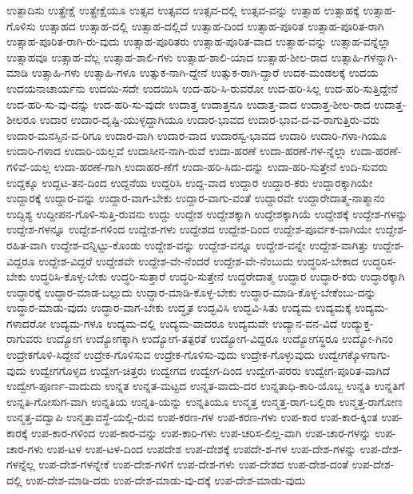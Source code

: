 {ಉತ್ಪಾದಿಸು
ಉತ್ಪ್ರೇಕ್ಷೆ
ಉತ್ಪ್ರೇಕ್ಷೆಯೂ
ಉತ್ಸವ
ಉತ್ಸವದ
ಉತ್ಸವ-ದಲ್ಲಿ
ಉತ್ಸವ-ವನ್ನು
ಉತ್ಸಾಹ
ಉತ್ಸಾಹಕ್ಕೆ
ಉತ್ಸಾಹ-ಗೊಳಿಸು
ಉತ್ಸಾಹದ
ಉತ್ಸಾಹ-ದಲ್ಲಿ
ಉತ್ಸಾಹ-ದಲ್ಲಿದೆ
ಉತ್ಸಾಹ-ದಿಂದ
ಉತ್ಸಾಹ-ಪೂರಿತ
ಉತ್ಸಾಹ-ಪೂರಿತ-ರಾಗಿ
ಉತ್ಸಾಹ-ಪೂರಿತ-ರಾಗಿ-ರು-ವುದು
ಉತ್ಸಾಹ-ಪೂರಿತರು
ಉತ್ಸಾಹ-ಪೂರಿತ-ವಾದ
ಉತ್ಸಾಹ-ವನ್ನು
ಉತ್ಸಾಹ-ವನ್ನೆಲ್ಲಾ
ಉತ್ಸಾಹವೂ
ಉತ್ಸಾಹ-ವೆಲ್ಲ
ಉತ್ಸಾಹ-ಶಾಲಿ-ಗಳು
ಉತ್ಸಾಹ-ಶಾಲಿ-ಯಾದ
ಉತ್ಸಾಹ-ಶೀಲ-ರಾದ
ಉತ್ಸಾಹಿ-ಗಳನ್ನಾಗಿ-ಮಾಡಿ
ಉತ್ಸಾಹಿ-ಗಳು
ಉತ್ಸಾಹಿ-ಗಳೂ
ಉತ್ಸುಕ-ನಾಗಿ-ದ್ದೇನೆ
ಉತ್ಸುಕ-ರಾಗಿ-ದ್ದಾರೆ
ಉದಕ-ಮಂಡಲಕ್ಕೆ
ಉದಯ
ಉದಯನಾಚಾರ್ಯನು
ಉದಯಿ-ಸದೇ
ಉದಯಿಸಿ
ಉದ-ಹರಿ-ಸಿ-ರುವರೋ
ಉದ-ಹರಿ-ಸಿಲ್ಲ
ಉದ-ಹರಿ-ಸುತ್ತಿದ್ದೇನೆ
ಉದ-ಹರಿ-ಸು-ವು-ದನ್ನು
ಉದ-ಹರಿ-ಸು-ವುದೇ
ಉದಾತ್ತ
ಉದಾತ್ತನೂ
ಉದಾತ್ತ-ವಾದ
ಉದಾತ್ತ-ಶೀಲ-ರಾದ
ಉದಾತ್ತ-ಶೀಲರೂ
ಉದಾರ
ಉದಾರ-ದೃಷ್ಟಿ-ಯುಳ್ಳದ್ದಾಗಿಯೂ
ಉದಾರ-ಭಾವದ
ಉದಾರ-ಭಾವ-ದ-ವ-ರಾಗುತ್ತಿರು-ವರು
ಉದಾರ-ಮನಸ್ಸಿನ-ವ-ರಿಗೂ
ಉದಾರ-ವಾಗಿ
ಉದಾರ-ವಾದ
ಉದಾರಸ್ವ-ಭಾವದ
ಉದಾರಿ
ಉದಾರಿ-ಗಳಾ-ಗಿಯೂ
ಉದಾರಿ-ಗಳಾದ
ಉದಾರಿ-ಯಲ್ಲವೆ
ಉದಾಸೀನ-ನಾಗಿ-ರುವೆ
ಉದಾ-ಹರಣೆ
ಉದಾ-ಹರಣೆ-ಗಳ-ನ್ನೆಲ್ಲಾ
ಉದಾ-ಹರಣೆ-ಗಳಿವೆ-ಯಲ್ಲ
ಉದಾ-ಹರಣೆ-ಗಾಗಿ
ಉದಾಹರ-ಣೆಗೆ
ಉದಾ-ಹರಿ-ಸಿದು-ದನ್ನು
ಉದಾ-ಹರಿ-ಸುತ್ತೇನೆ
ಉದಿ-ಸುವರು
ಉದ್ದಕ್ಕೂ
ಉದ್ದಟ-ತನ-ದಿಂದ
ಉದ್ದನೆಯ
ಉದ್ದರಿಸಿ
ಉದ್ದ-ವಾದ
ಉದ್ದಾರ
ಉದ್ದಾರ-ಕರು
ಉದ್ದಾರಕ್ಕಾಗಿಯೇ
ಉದ್ದಾರಕ್ಕೆ
ಉದ್ದಾರ-ವನ್ನು
ಉದ್ದಾರ-ವಾಗ-ಬೇಕು
ಉದ್ದಾರ-ವಾಗು-ವಂತೆ
ಉದ್ದಾರವೇ
ಉದ್ದಾರೇದಾತ್ಮ-ನಾತ್ಮಾನಂ
ಉದ್ದಿಶ್ಯ
ಉದ್ದೀಪನ-ಗೊಳಿ-ಸುತ್ತಿ-ರುವನು
ಉದ್ದು
ಉದ್ದೇಶ
ಉದ್ದೇಶಕ್ಕಾಗಿ
ಉದ್ದೇಶಕ್ಕಾಗಿಯೆ
ಉದ್ದೇಶಕ್ಕೆ
ಉದ್ದೇಶ-ಗಳನ್ನು
ಉದ್ದೇಶ-ಗಳನ್ನೂ
ಉದ್ದೇಶ-ಗಳಿಂದ
ಉದ್ದೇಶ-ಗಳು
ಉದ್ದೇಶದ
ಉದ್ದೇಶ-ದಿಂದ
ಉದ್ದೇಶ-ಪೂರ್ವಕ-ವಾಗಿಯೇ
ಉದ್ದೇಶ-ರಹಿತ-ವಾಗಿ
ಉದ್ದೇಶ-ವನ್ನಿಟ್ಟು-ಕೊಂಡು
ಉದ್ದೇಶ-ವನ್ನು
ಉದ್ದೇಶ-ವನ್ನೂ
ಉದ್ದೇಶ-ವನ್ನೇ
ಉದ್ದೇಶ-ವಾಗಿತ್ತು
ಉದ್ದೇಶ-ವಿದ್ದರೂ
ಉದ್ದೇಶ-ವಿದ್ದರೆ
ಉದ್ದೇಶವೇ
ಉದ್ದೇಶ-ವೇ-ನೆಂದರೆ
ಉದ್ದೇಶ-ವೇ-ನೆಂಬುದು
ಉದ್ಧರಿಸ-ಬೇಕಾದ
ಉದ್ಧರಿಸ-ಬೇಕು
ಉದ್ಧರಿಸಿ-ಕೊಳ್ಳ-ಬೇಕು
ಉದ್ಧರಿ-ಸುತ್ತಾರೆ
ಉದ್ಧರಿ-ಸುತ್ತೇನೆ
ಉದ್ಧರೇದಾತ್ಮ
ಉದ್ಧಾರ
ಉದ್ಧಾರ-ಕರು
ಉದ್ಧಾರಕ್ಕಾಗಿ
ಉದ್ಧಾರಕ್ಕೆ
ಉದ್ಧಾರ-ಮಾಡ-ಬಲ್ಲುದು
ಉದ್ಧಾರ-ಮಾಡಿ-ಕೊಳ್ಳ-ಬೇಕು
ಉದ್ಧಾರ-ಮಾಡಿ-ಕೊಳ್ಳ-ಬೇಕೆಂಬು-ದನ್ನು
ಉದ್ಧಾರ-ಮಾಡು-ವುದು
ಉದ್ಧಾರ-ವಾಗ-ಬೇಕು
ಉದ್ಧೃತ
ಉದ್ಭವಿಸಿ
ಉದ್ಭವಿ-ಸಿತು
ಉದ್ಯಮ
ಉದ್ಯಮಕ್ಕೆ
ಉದ್ಯಮ-ಗಳಾದರೋ
ಉದ್ಯಮ-ಗಳೂ
ಉದ್ಯಮ-ದಲ್ಲಿ
ಉದ್ಯಮ-ವಾದರೂ
ಉದ್ಯಮವೇ
ಉದ್ಯಾನ-ವನ-ವಿದೆ
ಉದ್ಯುಕ್ತ-ರಾಗುವರು
ಉದ್ಯೋಗ
ಉದ್ಯೋಗಕ್ಕಾಗಿ
ಉದ್ಯೋಗ-ತತ್ಪರತೆ
ಉದ್ಯೋಗ-ವಿದ್ದರೂ
ಉದ್ಯೋಗಸ್ಥರೂ
ಉದ್ಯೋ-ಗಿನಂ
ಉದ್ರೇಕಗೊಳಿ-ಸಿದ್ದೇನೆ
ಉದ್ರೇಕ-ಗೊಳಿಸುವ
ಉದ್ರೇಕ-ಗೊಳಿಸು-ವುದು
ಉದ್ರೇಕ-ಗೊಳ್ಳುವುದು
ಉದ್ವೇಗಕ್ಕೊಳಗಾಗು-ವುದು
ಉದ್ವೇಗಗೊಳ್ಳದ
ಉದ್ವೇಗ-ಚಿತ್ತರು
ಉದ್ವೇಗದ
ಉದ್ವೇಗ-ದಿಂದ
ಉದ್ವೇಗ-ಪರರು
ಉದ್ವೇಗ-ಪೂರಿತ-ವಾಗಿದೆ
ಉದ್ವೇಗ-ಪೂರ್ಣ-ವಾದುದು
ಉನ್ನತ
ಉನ್ನತ-ಮಟ್ಟದ
ಉನ್ನತ-ವಾದು-ದರ
ಉನ್ನತಾಧಿ-ಕಾರಿ-ಯೊಬ್ಬ
ಉನ್ನತಿ
ಉನ್ನತಿಗೆ
ಉನ್ನತಿ-ಗೋಸುಗ-ವಾಗಿ
ಉನ್ನತಿಯ
ಉನ್ನತಿ-ಯನ್ನು
ಉನ್ನತಿಯೂ
ಉನ್ಮತ್ತ
ಉನ್ಮತ್ತ-ರಾಗ-ಬಲ್ಲಿರಾ
ಉನ್ಮತ್ತ-ರಾಗೋಣ
ಉನ್ಮತ್ತ-ವದ್ವಾಪಿ
ಉನ್ಮತ್ತಾವಸ್ಥೆ-ಯಲ್ಲಿ-ರುವ
ಉಪ-ಕರಣ-ಗಳ
ಉಪ-ಕರಣ-ಗಳು
ಉಪ-ಕಾರ
ಉಪ-ಕಾರ-ಕ್ಕಿಂತ
ಉಪ-ಕಾರಕ್ಕೆ
ಉಪ-ಕಾರ-ಗಳಿಂದ
ಉಪ-ಕಾರ-ವನ್ನು
ಉಪ-ಕಾರಿ-ಗಳು
ಉಪ-ಚರಿಸ-ಲಿಲ್ಲ-ವಾಗಿ
ಉಪ-ಚಾರ-ಗಳನ್ನು
ಉಪ-ಚಾರ-ಗಳು
ಉಪ-ಟಳ
ಉಪ-ಟಳ-ದಿಂದ
ಉಪದೇಶ
ಉಪ-ದೇಶಕ್ಕೆ
ಉಪದೇ-ಶ-ಗಳ
ಉಪ-ದೇಶ-ಗಳನ್ನು
ಉಪ-ದೇಶ-ಗಳನ್ನೆಲ್ಲ
ಉಪ-ದೇಶ-ಗಳನ್ನೇಕೆ
ಉಪ-ದೇಶ-ಗಳಿಗೆ
ಉಪ-ದೇಶ-ಗಳು
ಉಪ-ದೇಶದ
ಉಪ-ದೇಶ-ದಂತೆ
ಉಪ-ದೇಶ-ದಲ್ಲಿ
ಉಪ-ದೇಶ-ಮಾಡಿ-ದರು
ಉಪ-ದೇಶ-ಮಾಡು-ವು-ದಕ್ಕೆ
ಉಪ-ದೇಶ-ಮಾಡು-ವುದು
}
